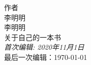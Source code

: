 \begin{titlepage}
  \raggedleft
  {\Large 作者\\ 李明明\\[1in] }
  {\Huge\scshape 李明明\\[.2in]}
  {\large 关于自己的一本书\\}
  \vfill
  {\itshape 首次编辑: 2020年11月1日\\}
  最后一次编辑：\today
  
\end{titlepage}

